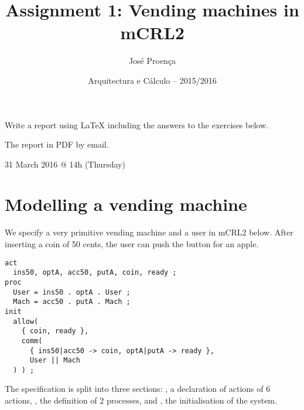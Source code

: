 \documentclass[11pt]{article}
\date{Arquitectura e C\'alculo -- 2015/2016}
\begin{document}
 
 
\title{Assignment 1: Vending machines in mCRL2}
\author{Jos\'{e} Proen\c{c}a} 


\maketitle


 Write a report using LaTeX including the answers to the exercises below.

 The report in PDF by email.

 31 March 2016 @ 14h (Thursday)
 
\section*{Modelling a vending machine}

\begin{exercise} \label{ex:vm1}
We specify a very primitive vending machine and a user in mCRL2 below. 
After inserting a coin of 50 cents, the user can push the button for an apple.

\begin{lstlisting}
act
  ins50, optA, acc50, putA, coin, ready ;
proc
  User = ins50 . optA . User ;
  Mach = acc50 . putA . Mach ;
init
  allow(
    { coin, ready },
    comm(
      { ins50|acc50 -> coin, optA|putA -> ready },
      User || Mach
  ) ) ;  
\end{lstlisting}  

The specification is split into three sections:
, a declaration of actions of 6 actions,
, the definition of 2 processes, and
, the initialisation of the system.





\end{exercise}
\end{document}
